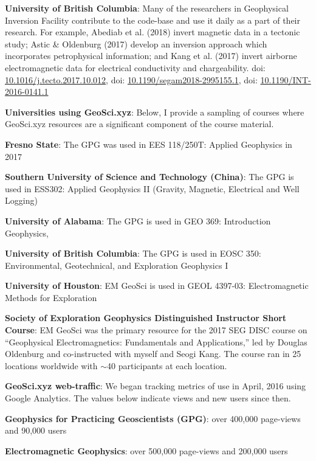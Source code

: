 \documentclass[a4paper, 11pt]{article}
\newcommand{\doi}[1]{doi: \href{https://doi.org/#1}{#1}}
\begin{document}
\begin{myitemize}
\item \textbf{University of British Columbia}: Many of the researchers in Geophysical Inversion Facility contribute to the code-base and use it daily as a part of their research. For example, Abediab et al. (2018) invert magnetic data in a tectonic study; Astic \& Oldenburg (2017) develop an inversion approach which incorporates petrophysical information; and Kang et al. (2017) invert airborne electromagnetic data for electrical conductivity and chargeability. \doi{10.1016/j.tecto.2017.10.012}, \doi{10.1190/segam2018-2995155.1}, \doi{10.1190/INT-2016-0141.1}
\end{myitemize}\vspace{0.3cm}

\textbf{Universities using GeoSci.xyz}: Below, I provide a sampling of courses where GeoSci.xyz resources are a significant component of the course material.
\begin{myitemize}\vspace{0.3cm}
\item \textbf{Fresno State}: The GPG was used in EES 118/250T: Applied Geophysics in 2017
\item \textbf{Southern University of Science and Technology (China)}: The GPG is used in ESS302: Applied Geophysics II (Gravity, Magnetic, Electrical and Well Logging)
\item \textbf{University of Alabama}: The GPG is used in GEO 369: Introduction Geophysics,
\item \textbf{University of British Columbia}: The GPG is used in EOSC 350: Environmental, Geotechnical, and Exploration Geophysics I
\item \textbf{University of Houston}: EM GeoSci is used in GEOL 4397-03: Electromagnetic Methods for Exploration
\end{myitemize}\vspace{0.3cm}

\textbf{Society of Exploration Geophysics Distinguished Instructor Short Course}: EM GeoSci was the primary resource for the 2017 SEG DISC course on ``Geophysical Electromagnetics: Fundamentals and Applications,'' led by Douglas Oldenburg and co-instructed with myself and Seogi Kang. The course ran in 25 locations worldwide with $\sim$40 participants at each location.\vspace{0.3cm}

\textbf{GeoSci.xyz web-traffic}: We began tracking metrics of use in April, 2016 using Google Analytics. The values below indicate views and new users since then.
\begin{myitemize}\vspace{0.3cm}
\item \textbf{Geophysics for Practicing Geoscientists (GPG)}: over 400,000 page-views and 90,000 users
\item \textbf{Electromagnetic Geophysics}: over 500,000 page-views and 200,000 users
\end{myitemize}\vspace{0.3cm}
\end{document}
